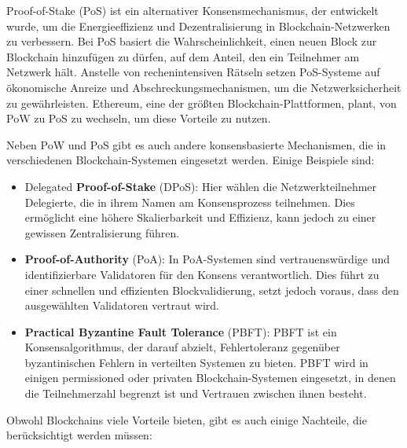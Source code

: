 \documentclass[../vs-script-first-v01.tex]{subfiles}
\begin{document}
Proof-of-Stake (PoS) ist ein alternativer Konsensmechanismus, der entwickelt wurde, um die Energieeffizienz und Dezentralisierung in Blockchain-Netzwerken zu verbessern. Bei PoS basiert die Wahrscheinlichkeit, einen neuen Block zur Blockchain hinzufügen zu dürfen, auf dem Anteil, den ein Teilnehmer am Netzwerk hält. Anstelle von rechenintensiven Rätseln setzen PoS-Systeme auf ökonomische Anreize und Abschreckungsmechanismen, um die Netzwerksicherheit zu gewährleisten. Ethereum, eine der größten Blockchain-Plattformen, plant, von PoW zu PoS zu wechseln, um diese Vorteile zu nutzen.

Neben PoW und PoS gibt es auch andere konsensbasierte Mechanismen, die in verschiedenen Blockchain-Systemen eingesetzt werden. Einige Beispiele sind:
\begin{itemize}
\item Delegated \textbf{Proof-of-Stake} (DPoS): Hier wählen die Netzwerkteilnehmer Delegierte, die in ihrem Namen am Konsensprozess teilnehmen. Dies ermöglicht eine höhere Skalierbarkeit und Effizienz, kann jedoch zu einer gewissen Zentralisierung führen.
\item \textbf{Proof-of-Authority} (PoA): In PoA-Systemen sind vertrauenswürdige und identifizierbare Validatoren für den Konsens verantwortlich. Dies führt zu einer schnellen und effizienten Blockvalidierung, setzt jedoch voraus, dass den ausgewählten Validatoren vertraut wird.
\item \textbf{Practical Byzantine Fault Tolerance} (PBFT): PBFT ist ein Konsensalgorithmus, der darauf abzielt, Fehlertoleranz gegenüber byzantinischen Fehlern in verteilten Systemen zu bieten. PBFT wird in einigen permissioned oder privaten Blockchain-Systemen eingesetzt, in denen die Teilnehmerzahl begrenzt ist und Vertrauen zwischen ihnen besteht.
\end{itemize}
Obwohl Blockchains viele Vorteile bieten, gibt es auch einige Nachteile, die berücksichtigt werden müssen:
\end{document}
